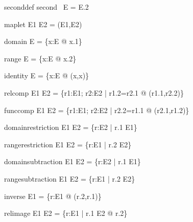 \documentclass{article}
\begin{document}
\begin{zedrule}{seconddef}
   second~ E = E.2
\end{zedrule}

\begin{zedrule}{maplet}
   E1 \mapsto E2 = (E1,E2)
\end{zedrule}

\begin{zedrule}{domain}
   \dom E = \{x:E @ x.1\}
\end{zedrule}

\begin{zedrule}{range}
   \ran E = \{x:E @ x.2\}
\end{zedrule}

\begin{zedrule}{identity}
   \id E = \{x:E @ (x,x)\}
\end{zedrule}

\begin{zedrule}{relcomp}
   E1 \comp E2 = \{r1:E1; r2:E2 | r1.2=r2.1 @ (r1.1,r2.2)\}
\end{zedrule}

\begin{zedrule}{funccomp}
   E1 \circ E2 = \{r1:E1; r2:E2 | r2.2=r1.1 @ (r2.1,r1.2)\}
\end{zedrule}

\begin{zedrule}{domainrestriction}
   E1 \dres E2 = \{r:E2 | r.1 \in E1\}
\end{zedrule}

\begin{zedrule}{rangerestriction}
   E1 \rres E2 = \{r:E1 | r.2 \in E2\}
\end{zedrule}

\begin{zedrule}{domainsubtraction}
   E1 \ndres E2 = \{r:E2 | r.1 \notin E1\}
\end{zedrule}

\begin{zedrule}{rangesubtraction}
   E1 \nrres E2 = \{r:E1 | r.2 \notin E2\}
\end{zedrule}

\begin{zedrule}{inverse}
   E1 \inv = \{r:E1 @ (r.2,r.1)\}
\end{zedrule}

\begin{zedrule}{relimage}
   E1 \limg E2 \rimg = \{r:E1 | r.1 \in E2 @ r.2\}
\end{zedrule}
\end{document}
